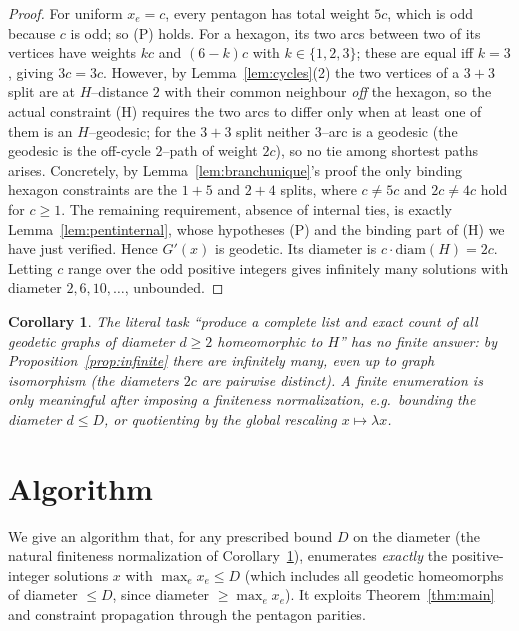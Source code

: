 \documentclass{amsart}
\newtheorem{corollary}{Corollary}
\theoremstyle{definition}
\begin{document}
\begin{proof}
For uniform $x_e=c$, every pentagon has total weight $5c$, which is odd because
$c$ is odd; so (P) holds. For a hexagon, its two arcs between two of its vertices
have weights $kc$ and $(6-k)c$ with $k\in\{1,2,3\}$; these are equal iff $k=3$,
giving $3c=3c$. However, by Lemma~\ref{lem:cycles}(2) the two vertices of a
$3{+}3$ split are at $H$--distance $2$ with their common neighbour \emph{off} the
hexagon, so the actual constraint (H) requires the two arcs to differ only when
at least one of them is an $H$--geodesic; for the $3{+}3$ split neither $3$--arc
is a geodesic (the geodesic is the off-cycle $2$--path of weight $2c$), so no
tie among shortest paths arises. Concretely, by Lemma~\ref{lem:branchunique}'s
proof the only binding hexagon constraints are the $1{+}5$ and $2{+}4$ splits,
where $c\ne5c$ and $2c\ne4c$ hold for $c\ge1$. The remaining requirement,
absence of internal ties, is exactly Lemma~\ref{lem:pentinternal}, whose
hypotheses (P) and the binding part of (H) we have just verified. Hence $G'(x)$
is geodetic. Its diameter is $c\cdot\mathrm{diam}(H)=2c$. Letting $c$ range over
the odd positive integers gives infinitely many solutions with diameter
$2,6,10,\dots$, unbounded.
\end{proof}

\begin{corollary}\label{cor:illposed}
The literal task ``produce a complete list and exact \emph{count} of all geodetic
graphs of diameter $d\ge2$ homeomorphic to $H$'' has no finite answer: by
Proposition~\ref{prop:infinite} there are infinitely many, even up to graph
isomorphism (the diameters $2c$ are pairwise distinct). A finite enumeration is
only meaningful after imposing a finiteness normalization, e.g.\ bounding the
diameter $d\le D$, or quotienting by the global rescaling $x\mapsto \lambda x$.
\end{corollary}

\section{Algorithm}

We give an algorithm that, for any prescribed bound $D$ on the diameter (the
natural finiteness normalization of Corollary~\ref{cor:illposed}), enumerates
\emph{exactly} the positive-integer solutions $x$ with $\max_e x_e\le D$ (which
includes all geodetic homeomorphs of diameter $\le D$, since diameter $\ge\max_e
x_e$). It exploits Theorem~\ref{thm:main} and constraint propagation through the
pentagon parities.
\end{document}
